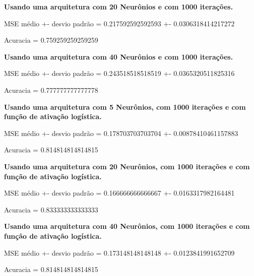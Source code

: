 \documentclass{article}
\begin{document}
\textbf{Usando uma arquitetura com 20 Neurônios e com 1000 iterações.}

\begin{Schunk}
\begin{Soutput}
MSE médio +- desvio padrão = 0.217592592592593 +- 0.0306318414217272
\end{Soutput}
\begin{Soutput}
Acuracia = 0.759259259259259
\end{Soutput}
\end{Schunk}


\textbf{Usando uma arquitetura com 40 Neurônios e com 1000 iterações.}

\begin{Schunk}
\begin{Soutput}
MSE médio +- desvio padrão = 0.243518518518519 +- 0.0365320511825316
\end{Soutput}
\begin{Soutput}
Acuracia = 0.777777777777778
\end{Soutput}
\end{Schunk}

\textbf{Usando uma arquitetura com 5 Neurônios, com 1000 iterações e com função de ativação logística.}

\begin{Schunk}
\begin{Soutput}
MSE médio +- desvio padrão = 0.178703703703704 +- 0.00878410461157883
\end{Soutput}
\begin{Soutput}
Acuracia = 0.814814814814815
\end{Soutput}
\end{Schunk}


\textbf{Usando uma arquitetura com 20 Neurônios, com 1000 iterações e com função de ativação logística.}

\begin{Schunk}
\begin{Soutput}
MSE médio +- desvio padrão = 0.166666666666667 +- 0.0163317982164481
\end{Soutput}
\begin{Soutput}
Acuracia = 0.833333333333333
\end{Soutput}
\end{Schunk}


\textbf{Usando uma arquitetura com 40 Neurônios, com 1000 iterações e com função de ativação logística.}

\begin{Schunk}
\begin{Soutput}
MSE médio +- desvio padrão = 0.173148148148148 +- 0.0123841991652709
\end{Soutput}
\begin{Soutput}
Acuracia = 0.814814814814815
\end{Soutput}
\end{Schunk}
\end{document}
